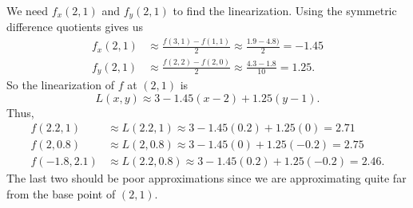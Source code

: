 \begin{activitySolution}
\item We need $f_x(2,1)$ and $f_y(2,1)$ to find the linearization. Using the symmetric difference quotients gives us
\begin{align*}
f_x(2,1) &\approx \frac{f(3,1)-f(1,1)}{2} \approx \frac{1.9-4.8)}{2} = -1.45 \\
f_y(2,1) &\approx \frac{f(2,2)-f(2,0)}{2} \approx \frac{4.3-1.8}{10} = 1.25.
\end{align*}  
So the linearization of $f$ at $(2, 1)$ is 
\[L(x,y) \approx 3 - 1.45(x-2) + 1.25(y-1).\]
Thus,
\begin{align*}
f(2.2,1) &\approx L(2.2,1) \approx 3 - 1.45(0.2) + 1.25(0) = 2.71 \\
f(2, 0.8) &\approx L(2, 0.8) \approx 3 - 1.45(0) + 1.25(-0.2) = 2.75 \\
f(-1.8, 2.1) &\approx L(2.2, 0.8) \approx 3 - 1.45(0.2) + 1.25(-0.2) = 2.46.
\end{align*}
The last two should be poor approximations since we are approximating quite far from the base point of $(2,1)$.
\ea
\end{activitySolution}

\aftera
